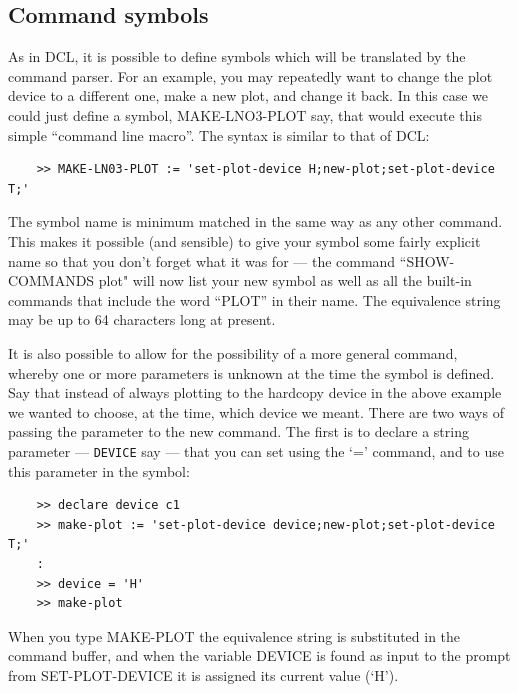 \documentclass[11pt,twoside]{report}
\begin{document}
\subsection{Command symbols}

As in DCL, it is possible to define symbols which will be translated
by the command parser. For an example, you may repeatedly want to change the
plot device to a different one, make a new plot, and change it back. In this
case we could just define a symbol, MAKE-LNO3-PLOT say, that would execute this
simple ``command line macro''. The syntax is similar
to that of DCL:
\begin{verbatim}
    >> MAKE-LN03-PLOT := 'set-plot-device H;new-plot;set-plot-device T;'
\end{verbatim}

The symbol name is minimum matched in the
same way as any other command. This makes it possible (and sensible) to give
your symbol some fairly explicit name so that you don't forget what it was for
--- the command ``SHOW-COMMANDS plot" will now list your new symbol as well as
all the built-in commands that include the word ``PLOT'' in their name. The
equivalence string may be up to
64 characters long at present.

It is also possible to allow for the possibility of a more general command,
whereby one or more parameters is unknown at the time the symbol is
defined. Say that instead of always
plotting to the hardcopy device in the above example we wanted to choose, at
the time, which device we meant. There are two ways of passing the parameter to
the new command. The first is to declare a string parameter --- \verb+DEVICE+
say --- that you can set using the `=' command, and to use this parameter in
the symbol:
\begin{verbatim}
    >> declare device c1
    >> make-plot := 'set-plot-device device;new-plot;set-plot-device T;'
    :
    >> device = 'H'
    >> make-plot
\end{verbatim}
When you type MAKE-PLOT the equivalence string is substituted in the command
buffer, and when the variable DEVICE is found as input to the prompt from
SET-PLOT-DEVICE it is assigned its current value (`H').
\end{document}
